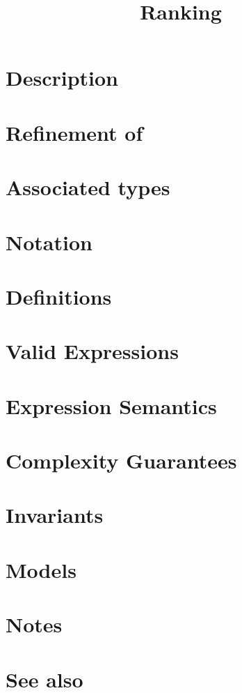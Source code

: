 \documentclass{article}
\begin{document}
\title{Ranking}
\maketitle

\section*{Description}
\section*{Refinement of}
\section*{Associated types}
\section*{Notation}
\section*{Definitions}
\section*{Valid Expressions}
\section*{Expression Semantics}
\section*{Complexity Guarantees}
\section*{Invariants}
\section*{Models}
\section*{Notes}
\section*{See also}




\end{document}

